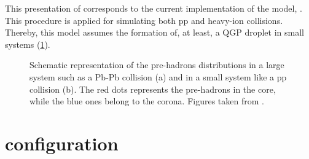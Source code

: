 This presentation of \Epos corresponds to the current implementation of the model, \EposFour. This procedure is applied for simulating both pp and heavy-ion collisions. Thereby, this model assumes the formation of, at least, a QGP droplet in small systems (\fig\ref{fig:CoreCoronaPbPbpp}). 

\begin{figure}[t]
\centering
{}
\caption{Schematic representation of the pre-hadrons distributions in a large system such as a Pb-Pb collision (a) and in a small system like a pp collision (b). The red dots represents the pre-hadrons in the core, while the blue ones belong to the corona. Figures taken from \cite{wernerCorecoronaProcedureMicrocanonical2023}.}
	\label{fig:CoreCoronaPbPbpp}
\end{figure}

\clearpage


\section{\Epos configuration}
\label{sec:AppEpos}

